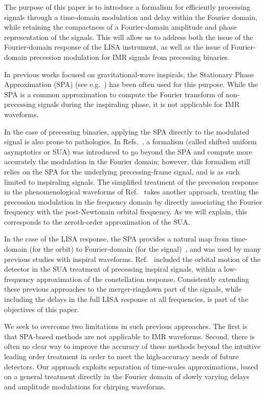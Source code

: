 \documentclass[aps,showpacs,twocolumn,
prd,superscriptaddress,nofootinbib]{revtex4-1}
\begin{document}
The purpose of this paper is to introduce a formalism for efficiently processing signals through a time-domain modulation and delay within the Fourier domain, while retaining the compactness of a Fourier-domain amplitude and phase representation of the signals. This will allow us to address both the issue of the Fourier-domain response of the LISA instrument, as well as the issue of Fourier-domain precession modulation for IMR signals from precessing binaries.

In previous works focused on gravitational-wave inspirals, the Stationary Phase Approximation (SPA) (see e.g.~\cite{Thorne300, CF94}) has been often used for this purpose. While the SPA is a common approximation to compute the Fourier transform of non-precessing signals during the inspiraling phase, it is not applicable for IMR waveforms.

In the case of precessing binaries, applying the SPA directly to the modulated signal is also prone to pathologies. In Refs.~\cite{KCY13,KCY14}, a formalism (called shifted uniform asymptotics or SUA) was introduced to go beyond the SPA and compute more accurately the modulation in the Fourier domain; however, this formalism still relies on the SPA for the underlying precessing-frame signal, and is as such limited to inspiraling signals. The simplified treatment of the precession response in the phenomenological waveforms of Ref.~\cite{Hannam+13} takes another approach, treating the precession modulation in the frequency domain by directly associating the Fourier frequency with the post-Newtonain orbital frequency. As we will explain, this corresponds to the zeroth-order approximation of the SUA.

In the case of the LISA response, the SPA provides a natural map from time-domain (for the orbit) to Fourier-domain (for the signal)~\cite{Cutler97}, and was used by many previous studies with inspiral waveforms. Ref.~\cite{Klein+15} included the orbital motion of the detector in the SUA treatment of precessing inspiral signals, within a low-frequency approximation of the constellation response. Consistently extending these previous approaches to the merger-ringdown part of the signals, while including the delays in the full LISA response at all frequencies, is part of the objectives of this paper.

We seek to overcome two limitations in such previous approaches.  The first is that  SPA-based methods are not applicable to IMR waveforms. Second, there is often no clear way to improve the accuracy of these methods beyond the intuitive leading order treatment in order to meet the high-accuracy needs of future detectors. Our approach exploits separation of time-scales approximations, based on a general treatment directly in the Fourier domain of slowly varying delays and amplitude modulations for chirping waveforms.
\end{document}
